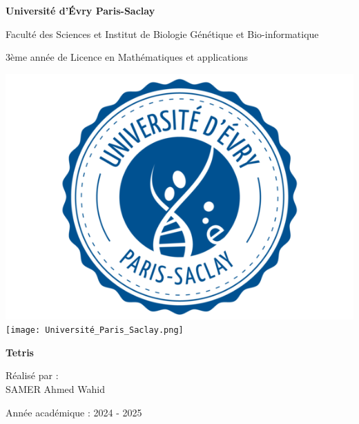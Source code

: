 \documentclass[12pt,a4paper]{report}
\begin{document}
\pagestyle{fancy}
	\renewcommand{\headrulewidth}{0.5pt}
    \fancyhead[L]{ \leftmark}

\begin{titlepage}
  \begin{center}

    \LARGE
    \textbf{Université d'Évry Paris-Saclay}

    \vspace{1cm}

    \large
    Faculté des Sciences et Institut de Biologie Génétique et Bio-informatique

    \vspace{1cm}

    \large
    3ème année de Licence en Mathématiques et applications

    \vspace{1cm}

\includegraphics[scale=1]{logo_login.png} 
\texttt{[image: Université\_Paris\_Saclay.png]} 

    \vspace{1cm}

    \LARGE
    \textbf{Tetris}

    \vspace{1cm}

    \large
    Réalisé par :\\ SAMER Ahmed Wahid


    \vspace{1cm}

    \large
    Année académique : 2024 - 2025

  \end{center}
\end{titlepage}
\end{document}
